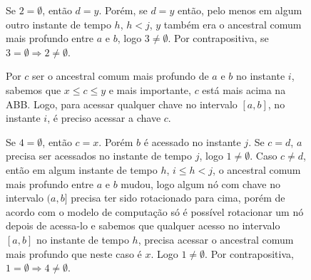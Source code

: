 \begin{figure}[H]
    \centering
    \begin{minipage}[t]{0.70\textwidth}
        Se $2 = \emptyset$, então $d = y$. Porém, se $d = y$ então, pelo menos em algum outro instante de tempo $h$, $h < j$, $y$ também era o ancestral comum mais profundo entre $a$ e $b$, logo $3 \neq \emptyset$. Por contrapositiva, se $3 = \emptyset \Rightarrow 2 \neq \emptyset$.

        Por $c$ ser o ancestral comum mais profundo de $a$ e $b$ no instante $i$, sabemos que $x \leq c \leq y$ e mais importante, $c$ está mais acima na ABB. Logo, para acessar qualquer chave no intervalo $[a,b]$, no instante $i$, é preciso acessar a chave $c$.
        
        Se $4 = \emptyset$, então $c = x$. Porém $b$ é acessado no instante $j$. Se $c = d$, $a$ precisa ser acessados no instante de tempo $j$, logo $1 \neq \emptyset$. Caso $c \neq d$, então em algum instante de tempo $h$, $i \leq h < j$, o ancestral comum mais profundo entre $a$ e $b$ mudou, logo algum nó com chave no intervalo $(a,b]$ precisa ter sido rotacionado para cima, porém de acordo com o modelo de computação só é possível rotacionar um nó depois de acessa-lo e sabemos que qualquer acesso no intervalo $[a,b]$ no instante de tempo $h$, precisa acessar o ancestral comum mais profundo que neste caso é $x$. Logo $1 \neq \emptyset$. Por contrapositiva, $1 = \emptyset \Rightarrow 4 \neq \emptyset$.

    \end{minipage}\hfill
    \begin{minipage}[t]{0.25\textwidth}
        \centering
        \begin{adjustbox}{valign=t} %
\end{adjustbox}
\end{minipage}
\end{figure}

